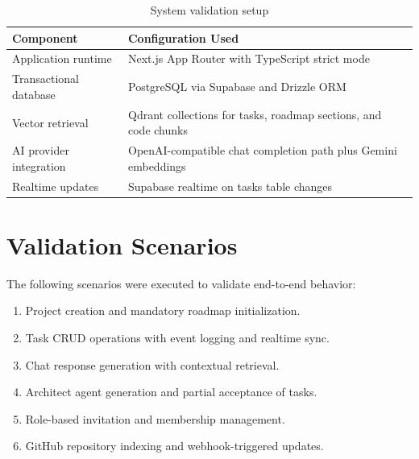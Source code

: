\documentclass[a4paper, 11pt, oneside]{Dissertation}
\begin{document}
\begin{table}[H]
\centering
\begin{tabular}{|L{4.2cm}|L{6.0cm}|}
\hline
\textbf{Component} & \textbf{Configuration Used} \\
\hline
Application runtime & Next.js App Router with TypeScript strict mode \\
\hline
Transactional database & PostgreSQL via Supabase and Drizzle ORM \\
\hline
Vector retrieval & Qdrant collections for tasks, roadmap sections, and code chunks \\
\hline
AI provider integration & OpenAI-compatible chat completion path plus Gemini embeddings \\
\hline
Realtime updates & Supabase realtime on tasks table changes \\
\hline
\end{tabular}
\caption{System validation setup}
\label{tab:setup}
\end{table}

\FloatBarrier

\section{Validation Scenarios}
The following scenarios were executed to validate end-to-end behavior:

\begin{enumerate}
\item Project creation and mandatory roadmap initialization.
\item Task CRUD operations with event logging and realtime sync.
\item Chat response generation with contextual retrieval.
\item Architect agent generation and partial acceptance of tasks.
\item Role-based invitation and membership management.
\item GitHub repository indexing and webhook-triggered updates.
\end{enumerate}
\end{document}
